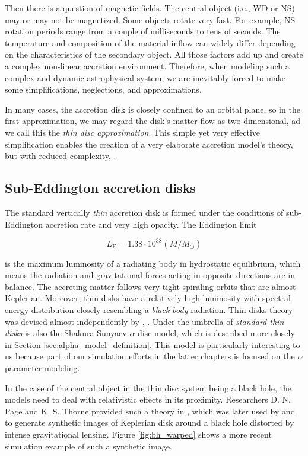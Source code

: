     Then there is a question of magnetic fields. The central object (i.e., WD or NS) may or may not be magnetized. Some objects rotate very fast. For example, NS rotation periods range from a couple of milliseconds to tens of seconds. The temperature and composition of the material inflow can widely differ depending on the characteristics of the secondary object. All those factors add up and create a complex non-linear accretion environment. Therefore, when modeling such a complex and dynamic astrophysical system, we are inevitably forced to make some simplifications, neglections, and approximations. 

    In many cases, the accretion disk is closely confined to an orbital plane, so in the first approximation, we may regard the disk's matter flow as two-dimensional, ad we call this the \emph{thin disc approximation}. This simple yet very effective simplification enables the creation of a very elaborate accretion model's theory, but with reduced complexity, \cite{acpow}.

\subsection{Sub-Eddington accretion disks}
    The standard vertically \emph{thin} accretion disk is formed under the conditions of sub-Eddington accretion rate and very high opacity. The Eddington limit
    
    \begin{equation}
        L_{\mathrm{E}} = 1.38 \cdot 10^{38} (M / M_{\odot}) 
    \end{equation}

    is the maximum luminosity of a radiating body in hydrostatic equilibrium, which means the radiation and gravitational forces acting in opposite directions are in balance. The accreting matter follows very tight spiraling orbits that are almost Keplerian. Moreover, thin disks have a relatively high luminosity with spectral energy distribution closely resembling a \emph{black body} radiation. Thin disks theory was devised almost independently by \cite{lyndenbell1974}, \cite{pringle1981}. Under the umbrella of \emph{standard thin disks} is also the Shakura-Sunyaev $\alpha$-disc model, which is described more closely in Section \ref{sec:alpha_model_definition}. This model is particularly interesting to us because part of our simulation efforts in the latter chapters is focused on the $\alpha$ parameter modeling.

    In the case of the central object in the thin disc system being a black hole, the models need to deal with relativistic effects in its proximity. Researchers D. N. Page and K. S. Thorne provided such a theory in \cite{page1974}, which was later used by \cite{luminet1979} and \cite{marck1996} to generate synthetic images of Keplerian disk around a black hole distorted by intense gravitational lensing. Figure \ref{fig:bh_warped} shows a more recent simulation example of such a synthetic image. 

